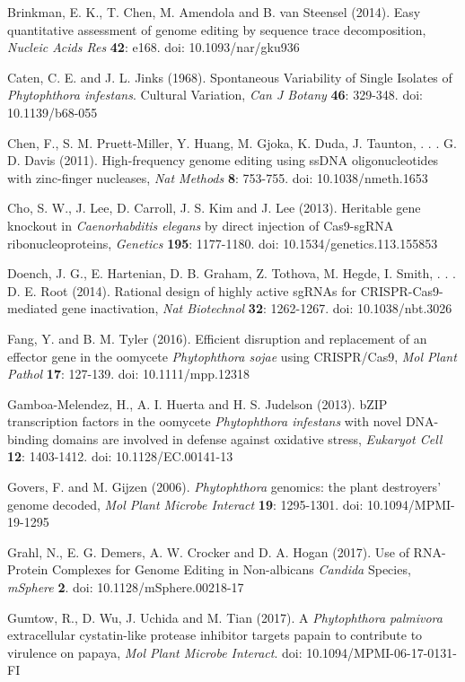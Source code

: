 \documentclass[onecolumn, 11pt,openany]{memoir}
\begin{document}
\begin{multicols}{2}
\begin{sloppy}
\begin{footnotesize}
Brinkman, E. K., T. Chen, M. Amendola and B. van Steensel (2014). Easy quantitative assessment of genome editing by sequence trace decomposition, \textit{Nucleic Acids Res} \textbf{42}: e168. doi: 10.1093/nar/gku936

Caten, C. E. and J. L. Jinks (1968). Spontaneous Variability of Single Isolates of \textit{Phytophthora infestans}. Cultural Variation, \textit{Can J Botany} \textbf{46}: 329-348. doi: 10.1139/b68-055

Chen, F., S. M. Pruett-Miller, Y. Huang, M. Gjoka, K. Duda, J. Taunton, . . . G. D. Davis (2011). High-frequency genome editing using ssDNA oligonucleotides with zinc-finger nucleases, \textit{Nat Methods} \textbf{8}: 753-755. doi: 10.1038/nmeth.1653

Cho, S. W., J. Lee, D. Carroll, J. S. Kim and J. Lee (2013). Heritable gene knockout in \textit{Caenorhabditis elegans} by direct injection of Cas9-sgRNA ribonucleoproteins, \textit{Genetics} \textbf{195}: 1177-1180. doi: 10.1534/genetics.113.155853

Doench, J. G., E. Hartenian, D. B. Graham, Z. Tothova, M. Hegde, I. Smith, . . . D. E. Root (2014). Rational design of highly active sgRNAs for CRISPR-Cas9-mediated gene inactivation, \textit{Nat Biotechnol} \textbf{32}: 1262-1267. doi: 10.1038/nbt.3026

Fang, Y. and B. M. Tyler (2016). Efficient disruption and replacement of an effector gene in the oomycete \textit{Phytophthora sojae} using CRISPR/Cas9, \textit{Mol Plant Pathol} \textbf{17}: 127-139. doi: 10.1111/mpp.12318

Gamboa-Melendez, H., A. I. Huerta and H. S. Judelson (2013). bZIP transcription factors in the oomycete \textit{Phytophthora infestans} with novel DNA-binding domains are involved in defense against oxidative stress, \textit{Eukaryot Cell} \textbf{12}: 1403-1412. doi: 10.1128/EC.00141-13

Govers, F. and M. Gijzen (2006). \textit{Phytophthora }genomics: the plant destroyers' genome decoded, \textit{Mol Plant Microbe Interact} \textbf{19}: 1295-1301. doi: 10.1094/MPMI-19-1295

Grahl, N., E. G. Demers, A. W. Crocker and D. A. Hogan (2017). Use of RNA-Protein Complexes for Genome Editing in Non-albicans \textit{Candida} Species, \textit{mSphere} \textbf{2}. doi: 10.1128/mSphere.00218-17

Gumtow, R., D. Wu, J. Uchida and M. Tian (2017). A \textit{Phytophthora palmivora} extracellular cystatin-like protease inhibitor targets papain to contribute to virulence on papaya, \textit{Mol Plant Microbe Interact}. doi: 10.1094/MPMI-06-17-0131-FI


\end{footnotesize}
\end{sloppy}
\end{multicols}
\end{document}
